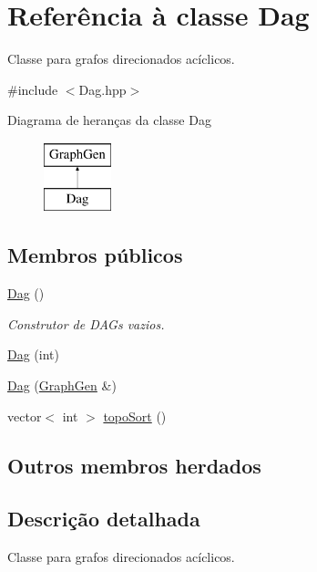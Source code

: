 \hypertarget{classDag}{}\section{Referência à classe Dag}
\label{classDag}


Classe para grafos direcionados acíclicos.  




{\ttfamily \#include $<$Dag.\+hpp$>$}

Diagrama de heranças da classe Dag\begin{figure}[H]
\begin{center}
\leavevmode
\includegraphics[height=2.000000cm]{classDag}
\end{center}
\end{figure}
\subsection*{Membros públicos}
\begin{DoxyCompactItemize}
\item 
\mbox{\label{classDag_a9389de85348f50a4cad1681d5d573e12}} 
\hyperlink{classDag_a9389de85348f50a4cad1681d5d573e12}{Dag} ()
\begin{DoxyCompactList}\small\item\em Construtor de D\+A\+Gs vazios. \end{DoxyCompactList}\item 
\hyperlink{classDag_a60039050421d45ed24d5fff16dd0b4d9}{Dag} (int)
\item 
\hyperlink{classDag_a7ac03b3c8b13d4a85956eec57a1b8cd3}{Dag} (\hyperlink{classGraphGen}{Graph\+Gen} \&)
\item 
vector$<$ int $>$ \hyperlink{classDag_ac2f36e91443cfeea16640a81865110d2}{topo\+Sort} ()
\end{DoxyCompactItemize}
\subsection*{Outros membros herdados}


\subsection{Descrição detalhada}
Classe para grafos direcionados acíclicos. 

